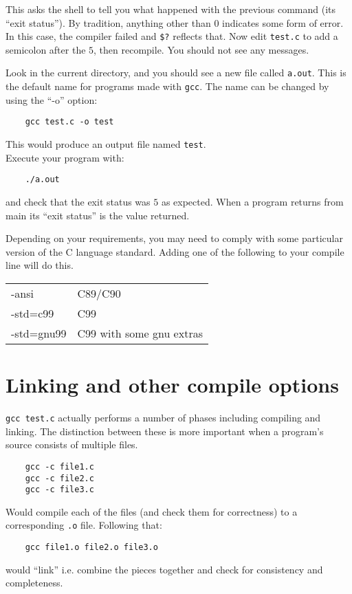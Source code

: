 This asks the shell to tell you what happened with the previous command (its ``exit status'').
By tradition, anything other than $0$ indicates some form of error.
In this case, the compiler failed and \verb!$?! reflects that.
Now edit \texttt{test.c} to add a semicolon after the $5$, then recompile.
You should not see any messages.

Look in the current directory, and you should see a new file called \texttt{a.out}.
This is the default name for programs made with \texttt{gcc}. The name can be changed
by using the ``-o'' option:

\begin{verbatim}
    gcc test.c -o test
\end{verbatim}
This would produce an output file named \texttt{test}.
\\
Execute your program with:
\begin{verbatim}
    ./a.out 
\end{verbatim}
and check that the exit status was $5$ as expected. When a program returns from main its ``exit status'' is the value returned.

Depending on your requirements, you may need to comply with some particular version of the C language standard.
Adding one of the following to your compile line will do this.\\

\begin{tabular}{l|l}
-ansi & C89/C90 \\
-std=c99 & C99 \\
-std=gnu99 & C99 with some gnu extras\\
\end{tabular}


\section{Linking and other compile options}
\texttt{gcc test.c} actually performs a number of phases including compiling and linking.
The distinction between these is more important when a program's source consists of multiple 
files.
\begin{verbatim}
    gcc -c file1.c
    gcc -c file2.c
    gcc -c file3.c
\end{verbatim}
Would compile each of the files (and check them for correctness) to a corresponding \texttt{.o} file.
Following that:
\begin{verbatim}
    gcc file1.o file2.o file3.o 
\end{verbatim}
would ``link'' i.e. combine the pieces together and check for consistency and completeness.

